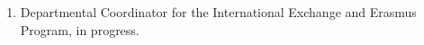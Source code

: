 

\begin{enumerate}
  \item
     Departmental Coordinator for the International Exchange and Erasmus Program, in progress.
\end{enumerate}
